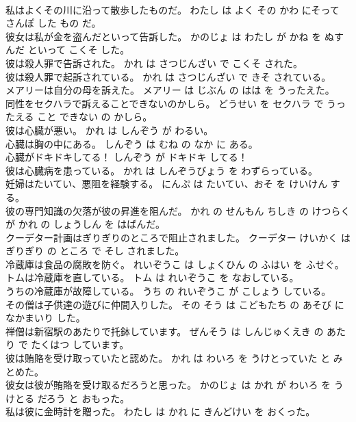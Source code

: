 \documentclass[8pt]{extreport}
\begin{document}
\begin{CJK}{UTF8}{min}
\\	私はよくその川に沿って散歩したものだ。	わたし は よく その かわ にそって さんぽ した もの だ。	
\\	彼女は私が金を盗んだといって告訴した。	かのじょ は わたし が かね を ぬすんだ といって こくそ した。	
\\	彼は殺人罪で告訴された。	かれ は さつじんざい で こくそ された。	
\\	彼は殺人罪で起訴されている。	かれ は さつじんざい で きそ されている。	
\\	メアリーは自分の母を訴えた。	メアリー は じぶん の はは を うったえた。	
\\	同性をセクハラで訴えることできないのかしら。	どうせい を セクハラ で うったえる こと できない の かしら。	
\\	彼は心臓が悪い。	かれ は しんぞう が わるい。	
\\	心臓は胸の中にある。	しんぞう は むね の なか に ある。	
\\	心臓がドキドキしてる！	しんぞう が ドキドキ してる！	
\\	彼は心臓病を患っている。	かれ は しんぞうびょう を わずらっている。	
\\	妊婦はたいてい、悪阻を経験する。	にんぷ は たいてい、おそ を けいけん する。	
\\	彼の専門知識の欠落が彼の昇進を阻んだ。	かれ の せんもん ちしき の けつらく が かれ の しょうしん を はばんだ。	
\\	クーデター計画はぎりぎりのところで阻止されました。	クーデター けいかく は ぎりぎり の ところ で そし されました。	
\\	冷蔵庫は食品の腐敗を防ぐ。	れいぞうこ は しょくひん の ふはい を ふせぐ。	
\\	トムは冷蔵庫を直している。	トム は れいぞうこ を なおしている。	
\\	うちの冷蔵庫が故障している。	うち の れいぞうこ が こしょう している。	
\\	その僧は子供達の遊びに仲間入りした。	その そう は こどもたち の あそび に なかまいり した。	
\\	禅僧は新宿駅のあたりで托鉢しています。	ぜんそう は しんじゅくえき の あたり で たくはつ しています。	
\\	彼は賄賂を受け取っていたと認めた。	かれ は わいろ を うけとっていた と みとめた。	
\\	彼女は彼が賄賂を受け取るだろうと思った。	かのじょ は かれ が わいろ を うけとる だろう と おもった。	
\\	私は彼に金時計を贈った。	わたし は かれ に きんどけい を おくった。	

\end{CJK}
\end{document}
